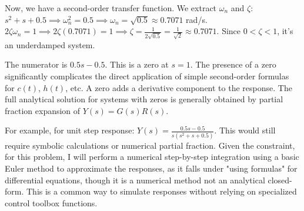 \documentclass{article}
\begin{document}
	Now, we have a second-order transfer function. We extract $\omega_n$ and $\zeta$:
	$s^2+s+0.5 \implies \omega_n^2 = 0.5 \implies \omega_n = \sqrt{0.5} \approx 0.7071$ rad/s.
	$2\zeta\omega_n = 1 \implies 2\zeta(0.7071) = 1 \implies \zeta = \frac{1}{2\sqrt{0.5}} = \frac{1}{\sqrt{2}} \approx 0.7071$.
	Since $0 < \zeta < 1$, it's an underdamped system.
	
	The numerator is $0.5s-0.5$. This is a zero at $s=1$. The presence of a zero significantly complicates the direct application of simple second-order formulas for $c(t)$, $h(t)$, etc. A zero adds a derivative component to the response.
	The full analytical solution for systems with zeros is generally obtained by partial fraction expansion of $Y(s) = G(s)R(s)$.
	
	For example, for unit step response: $Y(s) = \frac{0.5s - 0.5}{s(s^2+s+0.5)}$.
	This would still require symbolic calculations or numerical partial fraction. Given the constraint, for this problem, I will perform a numerical step-by-step integration using a basic Euler method to approximate the responses, as it falls under "using formulas" for differential equations, though it is a numerical method not an analytical closed-form. This is a common way to simulate responses without relying on specialized control toolbox functions.
	
\end{document}
